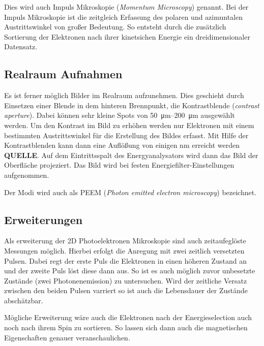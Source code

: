             Dies wird auch Impuls Mikroskopie (\textit{Momentum Microscopy}) genannt.
            Bei der Impuls Mikroskopie ist die zeitgleich Erfassung des polaren und azimuntalen Austrittswinkel von großer Bedeutung. 
            So entsteht durch die zusätzlich Sortierung der Elektronen nach ihrer kinetsichen Energie ein dreidimensionaler Datensatz.

        \subsection{Realraum Aufnahmen}
            Es ist ferner möglich Bilder im Realraum aufzunehmen.
            Dies geschieht durch Einsetzen einer Blende in dem hinteren Brennpunkt, die Kontrastblende (\textit{contrast aperture}).
            Dabei können sehr kleine Spots von \SIrange{50}{200}{\micro\meter} ausgewählt werden.
            Um den Kontrast im Bild zu erhöhen werden nur Elektronen mit einem bestimmten Austrittswinkel für die Erstellung des Bildes erfasst.
            Mit Hilfe der Kontrastblenden kann dann eine Auflößung von einigen \si{\nano\meter} erreicht werden \textbf{QUELLE}. 
            Auf dem Eintrittsspalt des Energyanalysators wird dann das Bild der Oberfläche projeziert.
            Das Bild wird bei festen Energiefilter-Einstellungen aufgenommen.

            Der Modi wird auch als PEEM (\textit{Photon emitted electron microscopy}) bezeichnet.

           
        
        \subsection{Erweiterungen}
            Als erweiterung der 2D Photoelektronen Mikroskopie sind auch zeitaufeglöste Messungen möglich.
            Hierbei erfolgt die Anregung mit zwei zeitlich versetzten Pulsen. 
            Dabei regt der erste Puls die Elektronen in einen höheren Zustand an und der zweite Puls löst diese dann aus.
            So ist es auch möglich zuvor unbesetzte Zustände (zwei Photonenemission) zu untersuchen.
            Wird der zeitliche Versatz zwischen den beiden Pulsen varriert so ist auch die Lebensdauer der Zustände abschätzbar.

            Mögliche Erweiterung wäre auch die Elektronen nach der Energieselection auch noch nach ihrem Spin zu sortieren.
            So lassen sich dann auch die magnetischen Eigenschaften genauer veranschaulichen.
        

